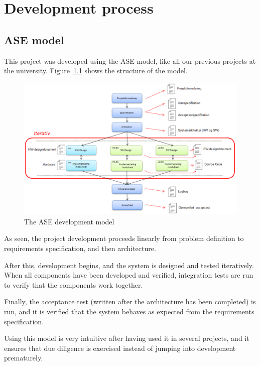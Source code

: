 \chapter{Development process}

\section{ASE model}
This project was developed using the ASE model, like all our previous projects at the university. Figure~\ref{fig:asemodel} shows the structure of the model.

\begin{figure}[H]
\centering
\includegraphics[width=1\linewidth]{ASE_model}
\caption{The ASE development model}
\label{fig:asemodel}
\end{figure}

 As seen, the project development proceeds linearly from problem definition to requirements specification, and then architecture. 
 
 After this, development begins, and the system is designed and tested iteratively. When all components have been developed and verified, integration tests are run to verify that the components work together.
 
  Finally, the acceptance test (written after the architecture has been completed) is run, and it is verified that the system behaves as expected from the requirements specification.
  
  Using this model is very intuitive after having used it in several projects, and it ensures that due diligence is exercised instead of jumping into development prematurely.
  

